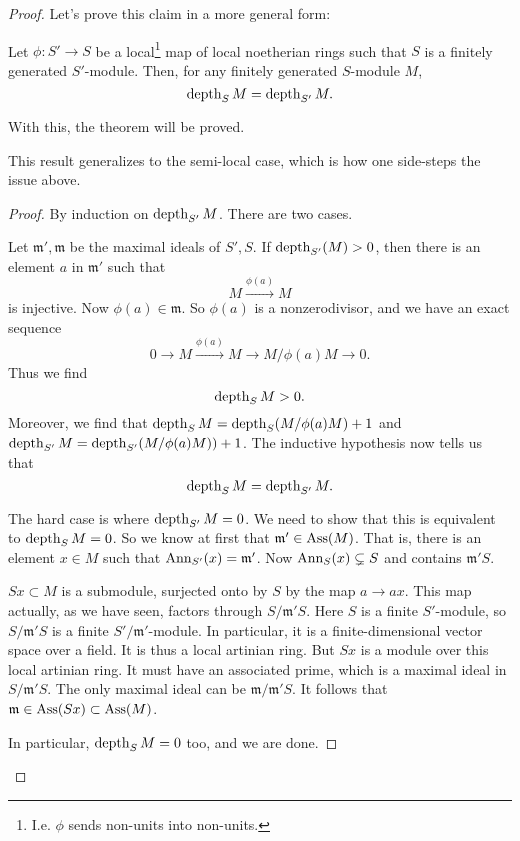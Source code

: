 \begin{example}
\begin{proof}
Let's prove this claim in a more general form:

\begin{proposition}
Let $\phi: S' \to S$ be a local\footnote{I.e. $\phi$ sends
non-units into
non-units.} map of local noetherian rings such that $S$ is a
finitely generated
$S'$-module. Then, for any finitely generated $S$-module $M$,
\[ \operatorname{depth}_S M = \operatorname{depth}_{S'} M.  \]
\end{proposition}
With this, the theorem will be proved.

\begin{remark}
This result generalizes to the semi-local case, which is how
one side-steps
the issue above.
\end{remark}

\begin{proof}
By induction on $\operatorname{depth}_{S'} M$. There are two cases.

Let $\mathfrak{m}', \mathfrak{m}$ be the maximal ideals of $S',
S$.
If $\operatorname{depth}_{S'}(M) >0$, then there is an element $a$ in
$\mathfrak{m}'$ such
that
\[ M \stackrel{\phi(a)}{\to} M \]
is injective. Now $\phi(a) \in \mathfrak{m}$. So $\phi(a)$ is a
nonzerodivisor, and we have an exact sequence
\[ 0 \to M \stackrel{\phi(a)}{\to} M \to M/\phi(a) M \to 0.  \]
Thus we find
\[ \operatorname{depth}_{S} M > 0 . \]
Moreover, we find that $\operatorname{depth}_S M = \operatorname{depth}_S (M/\phi(a) M) +1$
and
$\operatorname{depth}_{S'} M = \operatorname{depth}_{S'}(M/\phi(a) M))+1$. The inductive
hypothesis now
tells us that
\[ \operatorname{depth}_S M = \operatorname{depth}_{S'}M.  \]

The hard case is where $\operatorname{depth}_{S'} M = 0$. We need to show that
this is
equivalent to $\operatorname{depth}_{S} M = 0$. So we know at first that
$\mathfrak{m}' \in
\operatorname{Ass}(M)$. That is, there is an element $x \in M$ such that
$\operatorname{Ann}_{S'}(x) =
\mathfrak{m}'$.
Now $\operatorname{Ann}_S(x) \subsetneq S$ and contains $\mathfrak{m}' S$.

$Sx \subset M$ is a submodule, surjected onto by $S$ by the map
$a \to ax$.
This map actually, as we have seen, factors through
$S/\mathfrak{m}' S$. Here
$S$ is a finite $S'$-module, so $S/\mathfrak{m}'S$ is a finite
$S'/\mathfrak{m}'$-module. In particular, it is a
finite-dimensional vector space
over a field. It is thus a local artinian ring. But $Sx$ is a
module over this
local artinian ring. It must have an associated prime, which is
a maximal
ideal in $S/\mathfrak{m}'S$. The only maximal ideal can be
$\mathfrak{m}/\mathfrak{m}'S$. It follows that $\mathfrak{m}
\in\operatorname{Ass}(Sx)
\subset \operatorname{Ass}(M)$.

In particular, $\operatorname{depth}_S M = 0$ too, and we are done.
\end{proof}

\end{proof}
\end{example}

